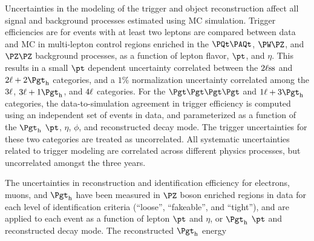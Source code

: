 Uncertainties in the modeling of the trigger and object reconstruction
affect all signal and background processes estimated using MC simulation.
Trigger efficiencies are for events with at least two leptons are compared
between data and MC in multi-lepton control regions enriched in the $\ttbar$,
$\PW\PZ$, and $\PZ\PZ$ background processes, as a function of lepton flavor,
$\pt$, and $\eta$.
This results in a small $\pt$ dependent uncertainty correlated between the
$2\ell\text{ss}$ and $\lltt$ categories, and a $1\%$ normalization uncertainty
correlated among the $3\ell$, $\lllt$, and $4\ell$ categories.
For the $\tttt$ and $\lttt$ categories, the data-to-simulation agreement in
trigger efficiency is computed using an independent set of events in data,
and parameterized as a function of the $\tauh$ $\pt$, $\eta$, $\phi$, and
reconstructed decay mode. %
The trigger uncertainties for these two categories are treated as uncorrelated.
All systematic uncertainties related to trigger modeling are correlated
across different physics processes, but uncorrelated amongst the three years.

The uncertainties in reconstruction and identification efficiency for electrons,
muons, and $\tauh$ have been measured in $\PZ$ boson enriched regions in data
for each level of identification criteria (``loose'', ``fakeable'', and ``tight''),
and are applied to each event as a function of lepton $\pt$ and $\eta$, or
$\tauh$ $\pt$ and reconstructed decay mode.
The reconstructed $\tauh$ energy 
